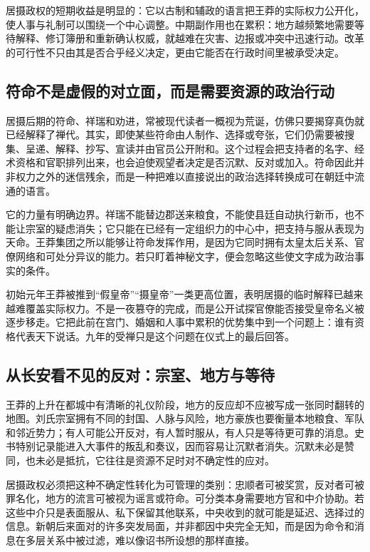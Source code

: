 居摄政权的短期收益是明显的：它以古制和辅政的语言把王莽的实际权力公开化，使人事与礼制可以围绕一个中心调整。中期副作用也在累积：地方越频繁地需要等待解释、修订簿册和重新确认权威，就越难在灾害、边报或冲突中迅速行动。改革的可行性不只由其是否合乎经义决定，更由它能否在行政时间里被承受决定。

\subsection{符命不是虚假的对立面，而是需要资源的政治行动}

居摄后期的符命、祥瑞和劝进，常被现代读者一概视为荒诞，仿佛只要揭穿真伪就已经解释了禅代。其实，即使某些符命由人制作、选择或夸张，它们仍需要被搜集、呈递、解释、抄写、宣读并由官员公开附和。这个过程会把支持者的名字、经术资格和官职排列出来，也会迫使观望者决定是否沉默、反对或加入。符命因此并非权力之外的迷信残余，而是一种把难以直接说出的政治选择转换成可在朝廷中流通的语言。

它的力量有明确边界。祥瑞不能替边郡送来粮食，不能使县廷自动执行新币，也不能让宗室的疑虑消失；它只能在已经有一定组织力的中心中，把支持与服从表现为天命。王莽集团之所以能够让符命发挥作用，是因为它同时拥有太皇太后关系、官僚网络和可处分异议的能力。若只盯着神秘文字，便会忽略这些使文字成为政治事实的条件。

初始元年王莽被推到“假皇帝”“摄皇帝”一类更高位置，表明居摄的临时解释已越来越难覆盖实际权力。不是一夜篡夺的完成，而是公开试探官僚能否接受皇帝名义被逐步移走。它把此前在宫门、婚姻和人事中累积的优势集中到一个问题上：谁有资格代表天下说话。九年的受禅只是这个问题在仪式上的最后回答。

\subsection{从长安看不见的反对：宗室、地方与等待}

王莽的上升在都城中有清晰的礼仪阶段，地方的反应却不应被写成一张同时翻转的地图。刘氏宗室拥有不同的封国、人脉与风险，地方豪族也要衡量本地粮食、军队和邻近势力；有人可能公开反对，有人暂时服从，有人只是等待更可靠的消息。史书特别记录能进入大事件的叛乱和奏议，因而容易让沉默者消失。沉默未必是赞同，也未必是抵抗，它往往是资源不足时对不确定性的应对。

居摄政权必须把这种不确定性转化为可管理的类别：忠顺者可被奖赏，反对者可被罪名化，地方的流言可被视为谣言或符命。可分类本身需要地方官和中介协助。若这些中介只是表面服从、私下保留其他联系，中央收到的就可能是延迟、选择过的信息。新朝后来面对的许多突发局面，并非都因中央完全无知，而是因为命令和消息在多层关系中被过滤，难以像诏书所设想的那样直接。

